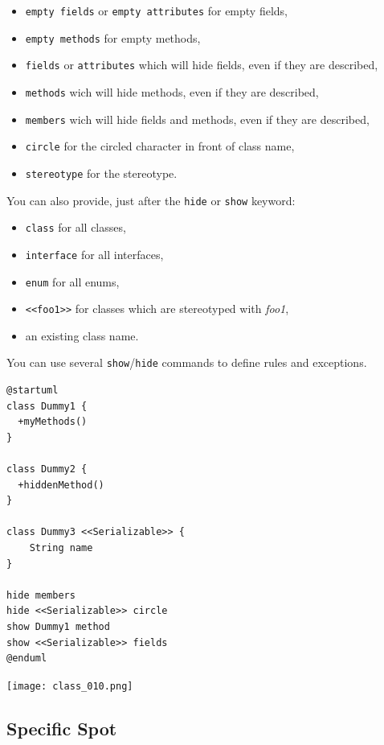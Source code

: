 \begin{itemize}
    \item \texttt{empty fields} or \texttt{empty attributes} for empty fields,
    \item \texttt{empty methods} for empty methods,
    \item \texttt{fields} or \texttt{attributes} which will hide fields, even if
    they are described,
    \item \texttt{methods} wich will hide methods, even if they are described,
    \item \texttt{members} wich will hide fields and methods, even if they are
    described,
    \item \texttt{circle} for the circled character in front of class name,
    \item \texttt{stereotype} for the stereotype. 
\end{itemize}

You can also provide, just after the \texttt{hide} or \texttt{show} keyword:

\begin{itemize}
    \item  \texttt{class} for all classes,
    \item  \texttt{interface} for all interfaces,
    \item  \texttt{enum} for all enums,
    \item  \texttt{<<foo1>>} for classes which are stereotyped with
    \textit{foo1},
    \item  an existing class name.
\end{itemize}

You can use several \texttt{show}/\texttt{hide} commands to define rules and
exceptions.

\begin{lstlisting}
@startuml
class Dummy1 {
  +myMethods()
}

class Dummy2 {
  +hiddenMethod()
}

class Dummy3 <<Serializable>> {
	String name
}

hide members
hide <<Serializable>> circle
show Dummy1 method
show <<Serializable>> fields
@enduml
\end{lstlisting}
\begin{center}
\texttt{[image: class\_010.png]}
\end{center}


\newpage \subsection{Specific Spot}

